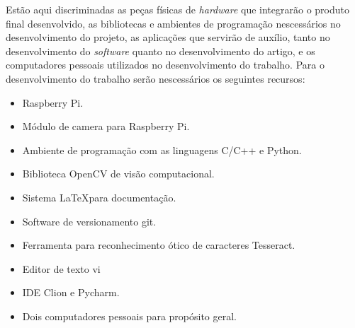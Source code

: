 Estão aqui discriminadas as peças físicas de \emph{hardware} que integrarão o
produto final desenvolvido, as bibliotecas e ambientes de programação
nescessários no desenvolvimento do projeto, as aplicações que servirão de
auxílio, tanto no desenvolvimento do \emph{software} quanto no desenvolvimento
do artigo, e os computadores pessoais utilizados no desenvolvimento do trabalho.
Para o desenvolvimento do trabalho serão nescessários os seguintes recursos:

\begin{itemize}
	\item Raspberry Pi.
	\item Módulo de camera para Raspberry Pi.
	\item Ambiente de programação com as linguagens C/C++ e Python.
	\item Biblioteca OpenCV de visão computacional.
	\item Sistema \LaTeX para documentação.
	\item Software de versionamento git.
	\item Ferramenta para reconhecimento ótico de caracteres Tesseract.
	\item Editor de texto vi
	\item IDE Clion e Pycharm.
	\item Dois computadores pessoais para propósito geral.
\end{itemize}
